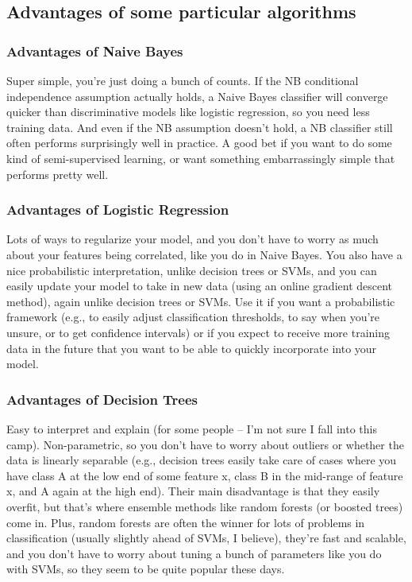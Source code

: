 \documentclass[12pt]{book}
\begin{document}
\subsection{Advantages of some particular algorithms}
\subsubsection{Advantages of Naive Bayes} Super simple, you're just doing a bunch of counts. If the NB conditional independence assumption actually holds, a Naive Bayes classifier will converge quicker than discriminative models like logistic regression, so you need less training data. And even if the NB assumption doesn't hold, a NB classifier still often performs surprisingly well in practice. A good bet if you want to do some kind of semi-supervised learning, or want something embarrassingly simple that performs pretty well.

\subsubsection{Advantages of Logistic Regression} Lots of ways to regularize your model, and you don't have to worry as much about your features being correlated, like you do in Naive Bayes. You also have a nice probabilistic interpretation, unlike decision trees or SVMs, and you can easily update your model to take in new data (using an online gradient descent method), again unlike decision trees or SVMs. Use it if you want a probabilistic framework (e.g., to easily adjust classification thresholds, to say when you're unsure, or to get confidence intervals) or if you expect to receive more training data in the future that you want to be able to quickly incorporate into your model.

\subsubsection{Advantages of Decision Trees} Easy to interpret and explain (for some people -- I'm not sure I fall into this camp). Non-parametric, so you don't have to worry about outliers or whether the data is linearly separable (e.g., decision trees easily take care of cases where you have class A at the low end of some feature x, class B in the mid-range of feature x, and A again at the high end). Their main disadvantage is that they easily overfit, but that's where ensemble methods like random forests (or boosted trees) come in. Plus, random forests are often the winner for lots of problems in classification (usually slightly ahead of SVMs, I believe), they're fast and scalable, and you don't have to worry about tuning a bunch of parameters like you do with SVMs, so they seem to be quite popular these days.
\end{document}
